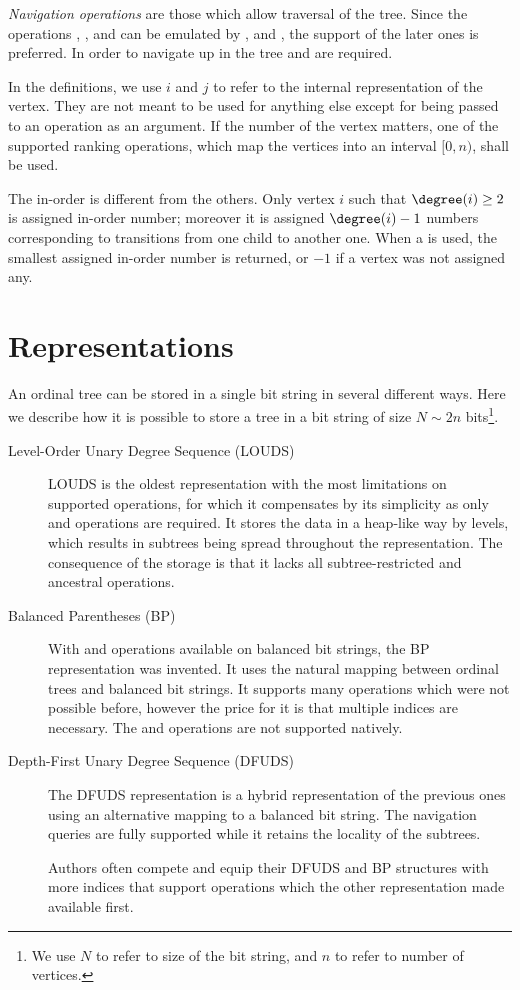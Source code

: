 \emph{Navigation operations} are those which allow traversal of the tree.
Since the operations \childPrev{}, \childNext{}, \childFirst{} and \childLast{} can be emulated by \childRank{}, \childSelect{} and \degree{}, the support of the later ones is preferred.
In order to navigate up in the tree \parent{} and \isRoot{} are required.

In the definitions, we use $i$ and $j$ to refer to the internal representation of the vertex.
They are not meant to be used for anything else except for being passed to an operation as an argument.
If the number of the vertex matters, one of the supported ranking operations, which map the vertices into an interval $[0, n)$, shall be used.

The in-order \rank{} is different from the others.
Only vertex $i$ such that $\degree(i) \ge 2$ is assigned in-order number; moreover it is assigned $\degree(i) - 1$ numbers corresponding to transitions from one child to another one.
When a \inRank{} is used, the smallest assigned in-order number is returned, or $-1$ if a vertex was not assigned any.

\section{Representations}

An ordinal tree can be stored in a single bit string in several different ways.
Here we describe how it is possible to store a tree in a bit string of size $N \sim 2n$ bits\footnote{
	We use $N$ to refer to size of the bit string, and $n$ to refer to number of vertices.
}.
\begin{description}
	\item[Level-Order Unary Degree Sequence (LOUDS)]
	LOUDS is the oldest representation with the most limitations on supported operations, for which it compensates by its simplicity as only \rank{} and \select{} operations are required.
	It stores the data in a heap-like way by levels, which results in subtrees being spread throughout the representation.
	The consequence of the storage is that it lacks all subtree-restricted and ancestral operations.
	
	\item[Balanced Parentheses (BP)]
	With \match{} and \enclose{} operations available on balanced bit strings, the BP representation was invented.
	It uses the natural mapping between ordinal trees and balanced bit strings.
	It supports many operations which were not possible before, however the price for it is that multiple indices are necessary.
	The \childRank{} and \childSelect{} operations are not supported natively.
	
	\item[Depth-First Unary Degree Sequence (DFUDS)]
	The DFUDS representation is a hybrid representation of the previous ones using an alternative mapping to a balanced bit string.
	The navigation queries are fully supported while it retains the locality of the subtrees.
	
	Authors often compete and equip their DFUDS and BP structures with more indices that support operations which the other representation made available first.
\end{description}

